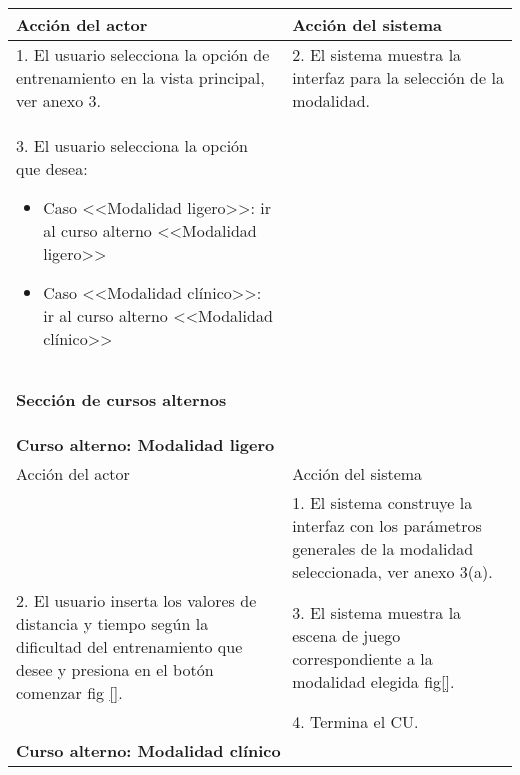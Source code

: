 \begin{center}
\begin{table}
\begin{tabularx}{\textwidth}{|X|X|}
            Acción del actor & Acción del sistema \\\hline
            1. El usuario selecciona la opción de entrenamiento en la vista principal, ver anexo 3. & 2. El sistema muestra la interfaz para la selección de la modalidad. \\\hline
            3. El usuario selecciona la opción que desea:
            \begin{itemize}
                \item Caso <<Modalidad ligero>>: ir al curso alterno <<Modalidad ligero>>
                \item Caso <<Modalidad clínico>>: ir al curso alterno <<Modalidad clínico>>
            \end{itemize} &  \\\hline
            
            \multicolumn{2}{|X|}{        
            \begin{minipage}[t]{0.925\columnwidth}
                \begin{center}
                    \textbf{Sección de cursos alternos}
                \end{center}
            \end{minipage}} \\\hline
            \multicolumn{2}{|X|}{        
            \begin{minipage}[t]{0.925\columnwidth}
                    \textbf{Curso alterno: Modalidad ligero}
            \end{minipage}} \\\hline
            
            Acción del actor & Acción del sistema \\\hline
            
            & 
            1. El sistema construye la interfaz con los parámetros generales de la modalidad seleccionada, ver anexo 3(a). \\\hline
            2. El usuario inserta los valores de distancia y tiempo según la dificultad del entrenamiento que desee y presiona en el botón comenzar fig \ref{}. 
            & 
            3. El sistema muestra la escena de juego correspondiente a la modalidad elegida fig\ref{}. \\ &4. Termina el CU. \\\hline
            
            \multicolumn{2}{|X|}{        
            \begin{minipage}[t]{0.925\columnwidth}
                    \textbf{Curso alterno: Modalidad clínico}
            \end{minipage}} \\\hline
            

\end{tabularx}
\end{table}
\end{center}
